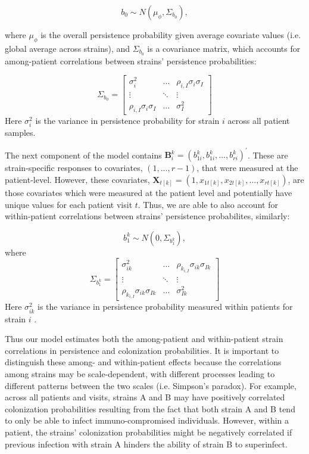 \documentclass{article}
\begin{document}
$$ b_0 \sim N(\mu_{\phi}, \Sigma_{b_{0}}), $$

where $\mu_{\phi}$ is the overall persistence probability given average covariate values (i.e. global average across strains), and $\Sigma_{b_{0}}$ is a covariance matrix, which accounts for among-patient correlations between strains' persistence probabilities:

$$ \Sigma_{b_{0}} = \left[
                \begin{array}{ccc}
                \sigma_{i}^2 & \dots & \rho_{i,I}\sigma_{i}\sigma_{I} \\
                \vdots & \ddots & \vdots \\
                \rho_{i,I}\sigma_{i}\sigma_{I} & \dots & \sigma_{I}^2
                \end{array}
                \right]
$$
Here $\sigma_{i}^2$ is the variance in persistence probability for strain $i$ across all patient samples. 

The next component of the model contains $ \textbf{B}^{k}_{i} = (b^k_{1i}, b^k_{1i}, \dots, b^k_{ri})^{'} $. These are strain-specific responses to covariates, $(1,...,r-1)$, that were measured at the patient-level. However, these covariates, $ \textbf{X}_{t[k]} = (1, x_{1t[k]}, x_{2t[k]}, \dots, x_{rt[k]}) $, are those covariates which were measured at the patient level and potentially have unique values for each patient visit $t$. Thus, we are able to also account for within-patient correlations between strains' persistence probabilites, similarly:

$$ b^k_1 \sim N(0, \Sigma_{b^k_{1}}), $$
where
$$ \Sigma_{b^k_{1}} = \left[
                \begin{array}{ccc}
                \sigma_{ik}^2 & \dots & \rho_{k_{i,I}}\sigma_{ik}\sigma_{Ik} \\
                \vdots & \ddots & \vdots \\
                \rho_{k_{i,I}}\sigma_{ik}\sigma_{Ik} & \dots & \sigma_{Ik}^2
                \end{array}
                \right]
$$
Here $\sigma_{ik}^2$ is the variance in persistence probability measured within patients for strain $i$ . 

Thus our model estimates both the among-patient and within-patient strain correlations in persistence and colonization probabilities. It is important to distinguish these among- and within-patient effects because the correlations among strains may be scale-dependent, with different processes leading to different patterns between the two scales (i.e. Simpson's paradox). For example, across all patients and visits, strains A and B may have positively correlated colonization probabilities resulting from the fact that both strain A and B tend to only be able to infect immuno-compromised individuals. However, within a patient, the strains' colonization probabilities might be negatively correlated if previous infection with strain A hinders the ability of strain B to superinfect. 
\end{document}
